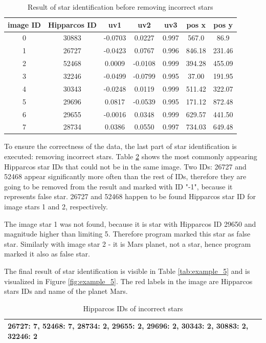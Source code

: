 \documentclass[12pt,a4paper,twoside]{article}
\begin{document}
\renewcommand{\arraystretch}{1.5}
\begin{table}[!htbp]
\centering
\begin{tabular}{|c|c|c|c|c|c|c|}
\hline 
image ID & Hipparcos ID & uv1 & uv2 & uv3 & pos x & pos y \\ 
\hline 
0 &  30883 & -0.0703 &  0.0227 & 0.997 &  567.0 &  86.9 \\
\hline 
1 &  26727 & -0.0423 &  0.0767 & 0.996 &  846.18 &  231.46 \\
\hline 
2 &  52468 &  0.0009 & -0.0108 & 0.999 &  394.28 &  455.09 \\
\hline 
3 &  32246 & -0.0499 & -0.0799 & 0.995 &  37.00 &  191.95 \\
\hline 
4 &  30343 & -0.0248 &  0.0119 & 0.999 &  511.42 &  322.07 \\
\hline 
5 &  29696 &  0.0817 & -0.0539 & 0.995 &  171.12 &  872.48 \\
\hline 
6 &  29655 & -0.0016 &  0.0348 & 0.999 &  629.57 &  441.50 \\
\hline 
7 &  28734 & 0.0386 & 0.0550 & 0.997 & 734.03 & 649.48 \\
\hline 
\end{tabular}
\caption{Result of star identification before removing incorrect stars}
\label{tab:example_3}
\end{table}

To ensure the correctness of the data, the last part of star identification is executed: removing incorrect stars. 
Table \ref{tab:example_4} shows the most commonly appearing Hipparcos star IDs that could not be in the same image. 
Two IDs: 26727 and 52468 appear significantly more often than the rest of IDs, therefore they are going to be removed from the result and marked with ID "-1", because it represents false star. 
26727 and 52468 happen to be found Hipparcos star ID for image stars 1 and 2, respectively.

The image star 1 was not found, because it is star with Hipparcos ID 29650 and magnitude higher than limiting 5. Therefore program marked this star as false star. 
Similarly with image star 2 - it is Mars planet, not a star, hence program marked it also as false star.

The final result of star identification is visible in Table \ref{tab:example_5} and is visualized in Figure \ref{fig:example_5}. The red labels in the image are Hipparcos stars IDs and name of the planet Mars.

\renewcommand{\arraystretch}{1.5}
\begin{table}[!htbp]
\centering
\begin{tabular}{|p{7cm}|}
\hline 
26727: 7, 52468: 7, 28734: 2, 29655: 2, 29696: 2, 30343: 2, 30883: 2, 32246: 2 \\
\hline 
\end{tabular}
\caption{Hipparcos IDs of incorrect stars}
\label{tab:example_4}
\end{table}
\end{document}
